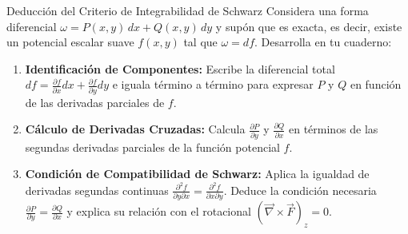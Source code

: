 \documentclass[10pt,aspectratio=169]{beamer}
\begin{document}
\begin{frame}{Deducción del Criterio de Integrabilidad de Schwarz}
  \vspace{0.05cm}
  Considera una forma diferencial $\omega = P(x, y)\,dx + Q(x, y)\,dy$ y supón que es exacta, es decir, existe un potencial escalar suave $f(x, y)$ tal que $\omega = df$. Desarrolla en tu cuaderno:
  \vspace{0.22cm}
  \begin{enumerate}\itemsep10pt
    \item[(a)] \textbf{Identificación de Componentes:} Escribe la diferencial total $df = \frac{\partial f}{\partial x}dx + \frac{\partial f}{\partial y}dy$ e iguala término a término para expresar $P$ y $Q$ en función de las derivadas parciales de $f$.
    \item[(b)] \textbf{Cálculo de Derivadas Cruzadas:} Calcula $\frac{\partial P}{\partial y}$ y $\frac{\partial Q}{\partial x}$ en términos de las segundas derivadas parciales de la función potencial $f$.
    \item[(c)] \textbf{Condición de Compatibilidad de Schwarz:} Aplica la igualdad de derivadas segundas continuas $\frac{\partial^2 f}{\partial y \partial x} = \frac{\partial^2 f}{\partial x \partial y}$. Deduce la condición necesaria $\frac{\partial P}{\partial y} = \frac{\partial Q}{\partial x}$ y explica su relación con el rotacional $(\vec{\nabla}\times\vec{F})_z = 0$.
  \end{enumerate}
\end{frame}
\end{document}
